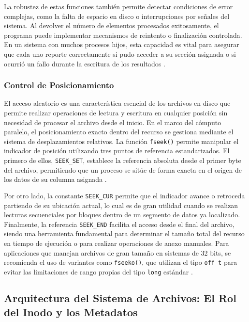 La robustez de estas funciones también permite detectar condiciones de error complejas, como la falta de espacio en disco o interrupciones por señales del sistema. Al devolver el número de elementos procesados exitosamente, el programa puede implementar mecanismos de reintento o finalización controlada. En un sistema con muchos procesos hijos, esta capacidad es vital para asegurar que cada uno reporte correctamente si pudo acceder a su sección asignada o si ocurrió un fallo durante la escritura de los resultados  \cite{glibc_manual, iso2024c}.

\subsubsection{Control de Posicionamiento}

El acceso aleatorio es una característica esencial de los archivos en disco que permite realizar operaciones de lectura y escritura 
en cualquier posición sin necesidad de procesar el archivo desde el inicio. En el marco del cómputo paralelo, el posicionamiento exacto dentro del recurso 
se gestiona mediante el sistema de desplazamientos relativos. 
La función \texttt{fseek()} permite manipular el indicador de posición utilizando tres puntos de referencia estandarizados. 
El primero de ellos, \texttt{SEEK\_SET}, establece la referencia absoluta desde el primer byte del archivo, permitiendo que un 
proceso se sitúe de forma exacta en el origen de los datos de su columna asignada \cite{glibc_manual, ieee2017posix}.

Por otro lado, la constante \texttt{SEEK\_CUR} permite que el indicador avance o retroceda partiendo de su ubicación actual, 
lo cual es de gran utilidad cuando se realizan lecturas secuenciales por bloques dentro de un segmento de datos ya localizado. 
Finalmente, la referencia \texttt{SEEK\_END} facilita el acceso desde el final del archivo, siendo una herramienta fundamental 
para determinar el tamaño total del recurso en tiempo de ejecución o para realizar operaciones de anexo manuales. 
Para aplicaciones que manejan archivos de gran tamaño en sistemas de 32 bits, se recomienda el uso de variantes como \texttt{fseeko()}, 
que utilizan el tipo \texttt{off\_t} para evitar las limitaciones de rango propias del tipo \texttt{long} estándar \cite{glibc_manual}.

\subsection{Arquitectura del Sistema de Archivos: El Rol del Inodo y los Metadatos}


